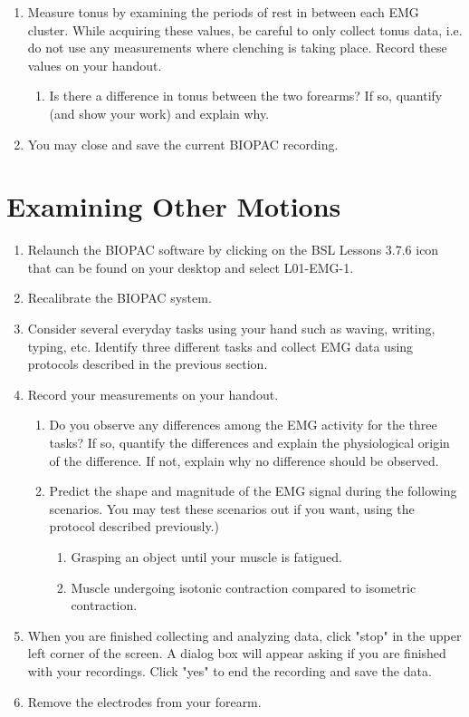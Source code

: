 \documentclass{article}
\begin{document}
\begin{enumerate}
	\item Measure tonus by examining the periods of rest in between each EMG cluster. While acquiring these values, be careful to only collect tonus data, i.e. do not use any measurements where clenching is taking place. Record these values on your handout.
	\begin{enumerate}
		\item Is there a difference in tonus between the two forearms? If so, quantify (and show your work) and explain why.
	\end{enumerate}
	
	\item You may close and save the current BIOPAC recording.
\end{enumerate}

\section*{Examining Other Motions}
\begin{enumerate}
	\item Relaunch the BIOPAC software by clicking on the BSL Lessons 3.7.6 icon that can be found on your desktop and select L01-EMG-1.
	\item Recalibrate the BIOPAC system.
	\item Consider several everyday tasks using your hand such as waving, writing, typing, etc. Identify three different tasks and collect EMG data using protocols described in the previous section.
	\item Record your measurements on your handout.
	\begin{enumerate}
		\item Do you observe any differences among the EMG activity for the three tasks? If so, quantify the differences and explain the physiological origin of the difference. If not, explain why no difference should be observed.
		\item Predict the shape and magnitude of the EMG signal during the following scenarios. You may test these scenarios out if you want, using the protocol described previously.)
		\begin{enumerate}
			\item Grasping an object until your muscle is fatigued.
			\item Muscle undergoing isotonic contraction compared to isometric contraction.
		\end{enumerate}
	\end{enumerate}
	
	\item When you are finished collecting and analyzing data, click "stop" in the upper left corner of the screen. A dialog box will appear asking if you are finished with your recordings. Click "yes" to end the recording and save the data.
	\item Remove the electrodes from your forearm.
\end{enumerate}
\end{document}
